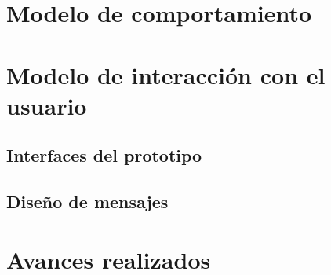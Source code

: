\documentclass[10pt]{book}
\begin{document}
 \chapter{Modelo de comportamiento}\label{chp:modeloComportamiento}

\chapter{Modelo de interacción con el usuario}\label{chp:modeloInteraccionUsuario}

\section{Interfaces del prototipo}
\section{Diseño de mensajes}

\chapter{Avances realizados}\label{chp:avances}




\end{document}
